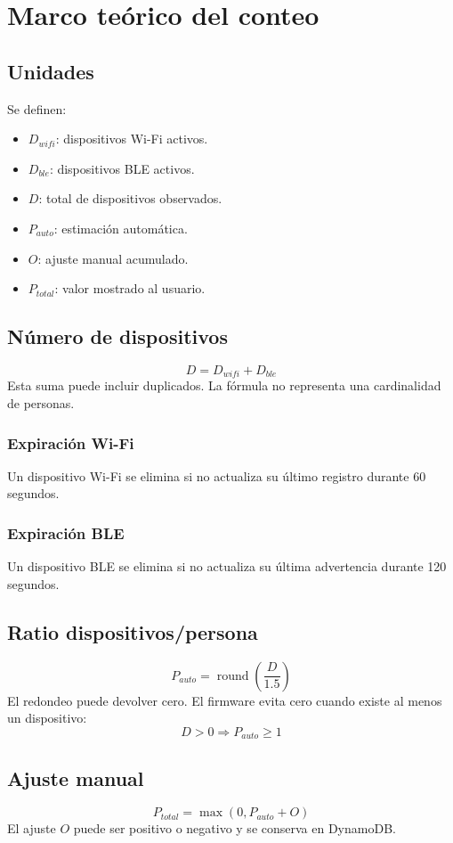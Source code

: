 \documentclass[12pt,a4paper]{article}
\begin{document}
\section{Marco teórico del conteo}
\subsection{Unidades}
Se definen:
\begin{itemize}
\item $D_{wifi}$: dispositivos Wi-Fi activos.
\item $D_{ble}$: dispositivos BLE activos.
\item $D$: total de dispositivos observados.
\item $P_{auto}$: estimación automática.
\item $O$: ajuste manual acumulado.
\item $P_{total}$: valor mostrado al usuario.
\end{itemize}

\subsection{Número de dispositivos}
\[
D=D_{wifi}+D_{ble}
\]
Esta suma puede incluir duplicados. La fórmula no representa una cardinalidad de personas.

\subsubsection{Expiración Wi-Fi}
Un dispositivo Wi-Fi se elimina si no actualiza su último registro durante 60 segundos.

\subsubsection{Expiración BLE}
Un dispositivo BLE se elimina si no actualiza su última advertencia durante 120 segundos.

\subsection{Ratio dispositivos/persona}
\[
P_{auto}=\operatorname{round}\left(\frac{D}{1.5}\right)
\]
El redondeo puede devolver cero. El firmware evita cero cuando existe al menos un dispositivo:
\[
D>0\Rightarrow P_{auto}\geq 1
\]

\subsection{Ajuste manual}
\[
P_{total}=\max(0,P_{auto}+O)
\]
El ajuste $O$ puede ser positivo o negativo y se conserva en DynamoDB.
\end{document}
